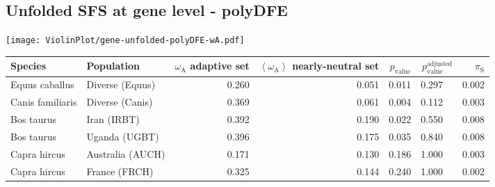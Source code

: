 \subsection{Unfolded SFS at gene level - polyDFE} 
\begin{center}
\texttt{[image: ViolinPlot/gene-unfolded-polyDFE-wA.pdf]} 
\begin{adjustbox}{width = 1\textwidth}
\begin{tabular}{|l|l|r|r|r|r|r|}
\toprule
             Species &                      Population & \specialcell{$\omega_{\mathrm{A}}$ \\ adaptive set} & \specialcell{$\left< \omega_{\mathrm{A}} \right>$ \\ nearly-neutral set} & $p_{\mathrm{value}}$ & $p_{\mathrm{value}}^{\mathrm{adjusted}}$ & $\pi_{\textrm{S}}$ \\
\midrule
      Equus caballus &                 Diverse (Equus) &                                              0.260 &                                              0.051 &                0.011 &                                  0.297~~ &              0.002 \\
    Canis familiaris &                 Diverse (Canis) &                                              0.369 &                                              0.061 &                0.004 &                                  0.112~~ &              0.003 \\
          Bos taurus &                     Iran (IRBT) &                                              0.392 &                                              0.190 &                0.022 &                                  0.550~~ &              0.008 \\
          Bos taurus &                   Uganda (UGBT) &                                              0.396 &                                              0.175 &                0.035 &                                  0.840~~ &              0.008 \\
        Capra hircus &                Australia (AUCH) &                                              0.171 &                                              0.130 &                0.186 &                                  1.000~~ &              0.003 \\
        Capra hircus &                   France (FRCH) &                                              0.325 &                                              0.144 &                0.240 &                                  1.000~~ &              0.002 \\

\end{tabular}
\end{adjustbox}
\end{center}
